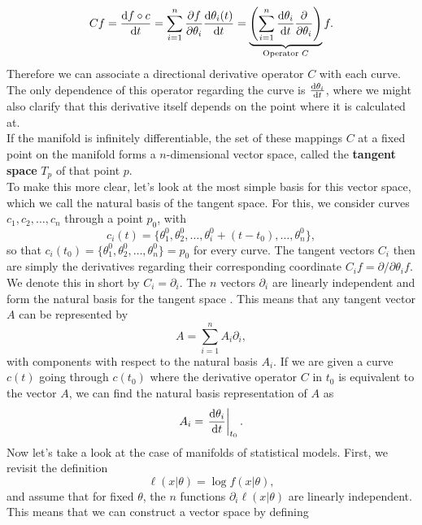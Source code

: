\begin{equation}
	Cf = \frac{\mathrm{d}f\circ c}{\mathrm{d}t} = \sum_{i=1}^{n} \frac{\partial f}{\partial\theta_i}\frac{\mathrm{d}\theta_i(t)}{\mathrm{d}t} = \underbrace{\left(\sum_{i=1}^{n}\frac{\mathrm{d}\theta_i}{\mathrm{d}t}\frac{\partial}{\partial\theta_i}\right)}_{\text{Operator }C} f.
\end{equation}
Therefore we can associate a directional derivative operator $C$ with each curve. The only dependence of this operator regarding the curve is $\frac{\mathrm{d}\theta_i}{\mathrm{d}t}$, where we might also clarify that this derivative itself depends on the point where it is calculated at.\\
If the manifold is infinitely differentiable, the set of these mappings $C$ at a fixed point on the manifold forms a $n$-dimensional vector space, called the \textbf{tangent space} $T_p$ of that point $p$. \\
To make this more clear, let's look at the most simple basis for this vector space, which we call the natural basis of the tangent space. For this, we consider curves $c_1,c_2, \dotsc ,c_n$ through a point $p_0$, with
\begin{equation}
	c_i(t) = \{\theta_1^0,\theta_2^0, \dotsc, \theta_i^0 + (t-t_0), \dotsc ,\theta_n^0 \},
\end{equation}
so that $c_i(t_0) = \{\theta_1^0,\theta_2^0, \dotsc,\theta_n^0\} = p_0$ for every curve. The tangent vectors $C_i$ then are simply the derivatives regarding their corresponding coordinate $C_i f = \partial/\partial \theta_i f$. We denote this in short by $C_i = \partial_i$. The $n$ vectors $\partial_i$ are linearly independent and form the natural basis for the tangent space \cite{AmarisLectureNotes} . This means that any tangent vector $A$ can be represented by \cite{AmarisLectureNotes} 
\begin{equation}
	A = \sum_{i=1}^{n} A_i \partial_i,
\end{equation}
with components with respect to the natural basis $A_i$. If we are given a curve $c(t)$ going through $c(t_0)$ where the derivative operator $C$ in $t_0$ is equivalent to the vector $A$, we can find the natural basis representation of $A$ as \cite{AmarisLectureNotes}
\begin{equation}
	A_i = \left. \frac{\mathrm{d}\theta_i}{\mathrm{d}t}\right|_{t_0}.
\end{equation}
Now let's take a look at the case of manifolds of statistical models. First, we revisit the definition
\begin{equation}
	\ell(x|\theta) = \log f(x|\theta),
\end{equation}
and assume that for fixed $\theta$, the $n$ functions $\partial_i \ell(x|\theta)$ are linearly independent. This means that we can construct a vector space by defining \cite{AmarisLectureNotes}
